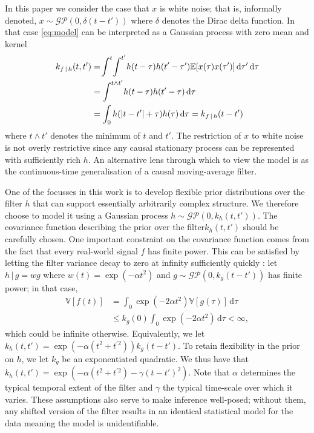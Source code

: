 \documentclass{article}
\newcommand{\id}[1]{\, \mathrm{d} #1}     %
\newcommand{\cond}{\, | \,}               %
\begin{document}
In this paper we consider the case that $x$ is white noise; that is, informally denoted, $x \sim \mathcal{GP}(0,\delta(t-t'))$ where $\delta$ denotes the Dirac delta function. In that case \cref{eq:model} can be interpreted as a Gaussian process with zero mean and kernel
\begin{align}
    k_{f\cond h}(t,t')&= \!\int^t \! \int^{t'}\!h(t- \tau) \vspace{-1mm} h(t'- \tau')
        \mathbb{E}[ x(\tau) x(\tau')]\id{\tau'} \id{\tau} \nonumber \\
    &= \int^{t \land t'} \! h(t - \tau) h(t' - \tau) \id{\tau} \nonumber \\
    &= \int_0 h(|t - t'| + \tau)h(\tau) \id{\tau} = k_{f\cond h}(t-t')  \label{eq:kernel}
\end{align}
where $t \land t'$ denotes the minimum of $t$ and $t'$. The restriction of $x$ to white noise is not overly restrictive since any causal stationary process can be represented with sufficiently rich $h$. An alternative lens through which to view the model is as the continuous-time generalisation of a causal moving-average filter.

One of the focusses in this work is to develop flexible prior distributions over the filter $h$ that can support essentially arbitrarily complex structure. We therefore choose to model it using a Gaussian process $h \sim \mathcal{GP}(0,k_h(t,t'))$. The covariance function describing the prior over the filter$k_h(t,t')$ should be carefully chosen. One important constraint on the covariance function comes from the fact that every real-world signal $f$ has finite power. This can be satisfied by letting the filter variance decay to zero at infinity sufficiently quickly \citet{Tobar:2015:Learning_Stationary}: let $h\cond g = w g$ where $w(t)= \exp(- \alpha t^2)$ and $g \sim \mathcal{GP}(0,k_g(t-t'))$ has finite power; in that case, %
\begin{align*}
    \mathbb{V}[f(t)]
    &= \int_{0}\exp(-2 \alpha t^2)\mathbb{V}[g(\tau)]\id{\tau} \\
    &\le k_g(0) \int_0 \exp(- 2 \alpha t^2) \id{\tau} < \infty,
\end{align*}
which could be infinite otherwise.
Equivalently, we let $k_h(t,t')=\exp(- \alpha (t^2 + t^{\prime 2}))k_g(t-t')$. To retain flexibility in the prior on $h$, we let $k_g$ be an exponentiated quadratic. We thus have that $k_h(t,t')=\exp(- \alpha (t^2 + t^{\prime 2}) - \gamma(t-t')^2)$. Note that $\alpha$ determines the typical temporal extent of the filter and $\gamma$ the typical time-scale over which it varies. These assumptions also serve to make inference well-posed; without them, any shifted version of the filter results in an identical statistical model for the data meaning the model is unidentifiable.
\end{document}
